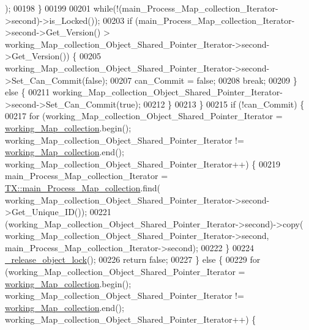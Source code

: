 \begin{DoxyCode}
      );
00198             \}
00199 
00201         \textcolor{keywordflow}{while}(!(main\_Process\_Map\_collection\_Iterator->second)->is\_Locked());
00203         \textcolor{keywordflow}{if} (main\_Process\_Map\_collection\_Iterator->second->Get\_Version() > 
      working\_Map\_collection\_Object\_Shared\_Pointer\_Iterator->second->Get\_Version()) \{
00205             working\_Map\_collection\_Object\_Shared\_Pointer\_Iterator->second->Set\_Can\_Commit(\textcolor{keyword}{false});
00207             can\_Commit = \textcolor{keyword}{false};
00208             \textcolor{keywordflow}{break};
00209         \} \textcolor{keywordflow}{else} \{ 
00211             working\_Map\_collection\_Object\_Shared\_Pointer\_Iterator->second->Set\_Can\_Commit(\textcolor{keyword}{true});
00212         \}
00213     \}
00215     \textcolor{keywordflow}{if} (!can\_Commit) \{
00217         \textcolor{keywordflow}{for} (working\_Map\_collection\_Object\_Shared\_Pointer\_Iterator = 
      \hyperlink{class_t_x_a81aafda16e2f20e36ec6c68e584668ff_a81aafda16e2f20e36ec6c68e584668ff}{working\_Map\_collection}.begin(); working\_Map\_collection\_Object\_Shared\_Pointer\_Iterator
       != \hyperlink{class_t_x_a81aafda16e2f20e36ec6c68e584668ff_a81aafda16e2f20e36ec6c68e584668ff}{working\_Map\_collection}.end(); 
      working\_Map\_collection\_Object\_Shared\_Pointer\_Iterator++) \{
00219             main\_Process\_Map\_collection\_Iterator  = 
      \hyperlink{class_t_x_a1a45d726894190695314464d7cd97c29_a1a45d726894190695314464d7cd97c29}{TX::main\_Process\_Map\_collection}.find(
      working\_Map\_collection\_Object\_Shared\_Pointer\_Iterator->second->Get\_Unique\_ID());
00221             (working\_Map\_collection\_Object\_Shared\_Pointer\_Iterator->second)->copy(
      working\_Map\_collection\_Object\_Shared\_Pointer\_Iterator->second, main\_Process\_Map\_collection\_Iterator->second);
00222         \}
00224         \hyperlink{class_t_x_a4c13d2015dc15d0f788fa9a1413f0463_a4c13d2015dc15d0f788fa9a1413f0463}{\_release\_object\_lock}();
00226         \textcolor{keywordflow}{return} \textcolor{keyword}{false};
00227     \} \textcolor{keywordflow}{else} \{
00229         \textcolor{keywordflow}{for} (working\_Map\_collection\_Object\_Shared\_Pointer\_Iterator = 
      \hyperlink{class_t_x_a81aafda16e2f20e36ec6c68e584668ff_a81aafda16e2f20e36ec6c68e584668ff}{working\_Map\_collection}.begin(); working\_Map\_collection\_Object\_Shared\_Pointer\_Iterator
       != \hyperlink{class_t_x_a81aafda16e2f20e36ec6c68e584668ff_a81aafda16e2f20e36ec6c68e584668ff}{working\_Map\_collection}.end(); 
      working\_Map\_collection\_Object\_Shared\_Pointer\_Iterator++) \{

\end{DoxyCode}
